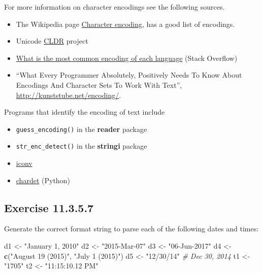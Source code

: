 \documentclass[]{book}
\newenvironment{Shaded}{\begin{snugshade}}{\end{snugshade}}
\newcommand{\CommentTok}[1]{\textcolor[rgb]{0.56,0.35,0.01}{\textit{#1}}}
\newcommand{\KeywordTok}[1]{\textcolor[rgb]{0.13,0.29,0.53}{\textbf{#1}}}
\newcommand{\NormalTok}[1]{#1}
\newcommand{\StringTok}[1]{\textcolor[rgb]{0.31,0.60,0.02}{#1}}
\providecommand{\tightlist}{%
  \setlength{\itemsep}{0pt}\setlength{\parskip}{0pt}}
\theoremstyle{plain}
\theoremstyle{remark}
\begin{document}
For more information on character encodings see the following sources.

\begin{itemize}
\tightlist
\item
  The Wikipedia page
  \href{https://en.wikipedia.org/wiki/Character_encoding}{Character
  encoding}, has a good list of encodings.
\item
  Unicode \href{http://cldr.unicode.org/}{CLDR} project
\item
  \href{https://stackoverflow.com/questions/8509339/what-is-the-most-common-encoding-of-each-language}{What
  is the most common encoding of each language} (Stack Overflow)
\item
  ``What Every Programmer Absolutely, Positively Needs To Know About
  Encodings And Character Sets To Work With Text'',
  \url{http://kunststube.net/encoding/}.
\end{itemize}

Programs that identify the encoding of text include

\begin{itemize}
\tightlist
\item
  \texttt{guess\_encoding()} in the \textbf{reader} package
\item
  \texttt{str\_enc\_detect()} in the \textbf{stringi} package
\item
  \href{https://en.wikipedia.org/wiki/Iconv}{iconv}
\item
  \href{https://github.com/chardet/chardet}{chardet} (Python)
\end{itemize}

\hypertarget{exercise-11.3.5.7}{%
\subsection*{\texorpdfstring{Exercise
{11.3.5.7}}{Exercise 11.3.5.7}}\label{exercise-11.3.5.7}}

Generate the correct format string to parse each of the following dates
and times:

\begin{Shaded}
\begin{Highlighting}[]
\NormalTok{d1 <-}\StringTok{ "January 1, 2010"}
\NormalTok{d2 <-}\StringTok{ "2015-Mar-07"}
\NormalTok{d3 <-}\StringTok{ "06-Jun-2017"}
\NormalTok{d4 <-}\StringTok{ }\KeywordTok{c}\NormalTok{(}\StringTok{"August 19 (2015)"}\NormalTok{, }\StringTok{"July 1 (2015)"}\NormalTok{)}
\NormalTok{d5 <-}\StringTok{ "12/30/14"} \CommentTok{# Dec 30, 2014}
\NormalTok{t1 <-}\StringTok{ "1705"}
\NormalTok{t2 <-}\StringTok{ "11:15:10.12 PM"}
\end{Highlighting}
\end{Shaded}
\end{document}
